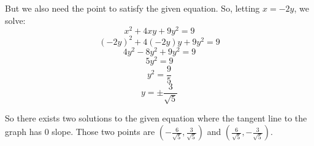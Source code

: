 \documentclass[nooutcomes]{ximera}
\begin{document}
\begin{problem}
\begin{enumerate}
\begin{freeResponse}
		But we also need the point to satisfy the given equation.  So, letting $x=-2y$, we solve:
		$$x^2 + 4xy + 9y^2 = 9 $$
		$$ (-2y)^2 + 4(-2y)y + 9y^2 = 9 $$
		$$ 4y^2 - 8y^2 + 9y^2 = 9 $$
		$$ 5y^2 = 9 $$
		$$ y^2 = \frac{9}{5} $$
		$$ y = \pm \frac{3}{\sqrt{5}} $$
		
		So there exists two solutions to the given equation where the tangent line to the graph has 0 slope.  Those two points are $\left( -\frac{6}{\sqrt{5}}, \frac{3}{\sqrt{5}} \right)$ and $\left( \frac{6}{\sqrt{5}}, - \frac{3}{\sqrt{5}} \right)$.
		\end{freeResponse}
		
		
		
	\end{enumerate}
			
			
	
\end{problem}
\end{document}
